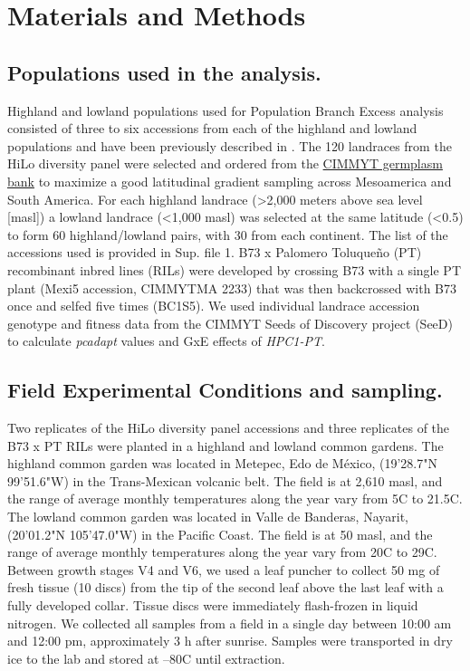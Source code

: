 \documentclass[9pt,twocolumn,twoside,lineno]{biorxiv}
\begin{document}
\section{Materials and Methods}
\label{sec:materials:methods}
\subsection{Populations used in the analysis.} 
Highland and lowland populations used for Population Branch Excess analysis consisted of three to six accessions from each of the highland and lowland populations and have been previously described in \cite{Wang2020-mp, Wang2017-bc}. 
The 120 landraces from the HiLo diversity panel were selected and ordered from the \href{http://mgb.cimmyt.org/gringlobal/search.aspx}{CIMMYT germplasm bank} to maximize a good latitudinal gradient sampling across Mesoamerica and South America. 
For each highland landrace (>2,000 meters above sea level [masl]) a lowland landrace (<1,000 masl) was selected at the same latitude (<0.5\degree) to form 60 highland/lowland pairs, with 30 from each continent. 
The list of the accessions used is provided in Sup. file 1.   
B73 x Palomero Toluqueño (PT) recombinant inbred lines (RILs) were developed by crossing B73 with a single PT plant (Mexi5 accession, CIMMYTMA 2233) that was then backcrossed with B73 once and selfed five times (BC1S5).  
We used  individual landrace accession genotype and fitness data from the CIMMYT Seeds of Discovery project (SeeD) \cite{Gates2019-xu} to calculate \textit{pcadapt} \cite{Luu2017-ws} values and GxE effects of \textit{HPC1-PT}.
\subsection{Field Experimental Conditions and sampling.} 
Two replicates of the HiLo diversity panel accessions and three replicates of the B73 x PT RILs were planted in a highland and lowland common gardens. 
The highland common garden was located in Metepec, Edo de M\'exico, (19'28.7"N 99'51.6"W) in the Trans-Mexican volcanic belt. 
The field is at 2,610 masl, and the range of average monthly temperatures along the year vary from 5\degree C to 21.5\degree C.  
The lowland common garden was located in Valle de Banderas, Nayarit, (20'01.2"N 105'47.0"W) in the Pacific Coast. 
The field is at 50 masl, and the range of average monthly temperatures along the year vary from 20\degree C to 29\degree C.
Between growth stages V4 and V6, we used a leaf puncher to collect 50 mg of fresh tissue (10 discs) from the tip of the second leaf above the last leaf with a fully developed collar. 
Tissue discs were immediately flash-frozen in liquid nitrogen. 
We collected all samples from a field in a single day between 10:00 am and 12:00 pm, approximately 3 h after sunrise.
Samples were transported in dry ice to the lab and stored at --80\degree C until extraction. 
\end{document}

